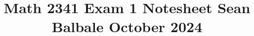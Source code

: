 


% 





\documentclass[10pt]{article}
\usepackage[margin=0.25in]{geometry}
\usepackage{amsmath, amssymb}
\usepackage{multicol}
\setlength{\columnsep}{0.7cm} 
\setlength{\parindent}{0in}
\title{\raggedright \large Math 2341 Exam 1 Notesheet \hfill Sean Balbale \hfill October 2024 \vspace{-3em}}
\date{}


